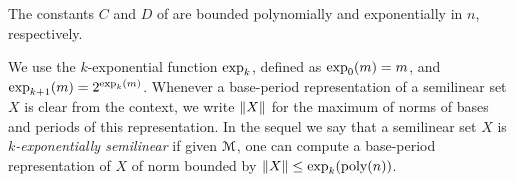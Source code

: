 \begin{claim} \label{claim:bounds}
  The constants $C$ and $D$ of  are bounded
  polynomially and exponentially in $n$, respectively.
\end{claim}

\newcommand{\poly}[1]{\text{poly}(#1)}
We use the $k$-exponential function $\exp_{k}$, defined as
$\exp_{0} (m) = m$, and $\exp_{k+1} (m) = 2^{\exp_{k} (m)}$.
Whenever a base-period representation of a semilinear set $X$ is clear
from the context, 
we write
$\lVert X\rVert$ for the maximum of norms of bases
and periods of this representation.
In the sequel we say that a semilinear set $X$ is 
\emph{$k$-exponentially semilinear} if given $\mathcal{M}$,
one can compute
a base-period representation of $X$
of norm bounded by $\norm X \leq \expf k(\poly n)$.
  




